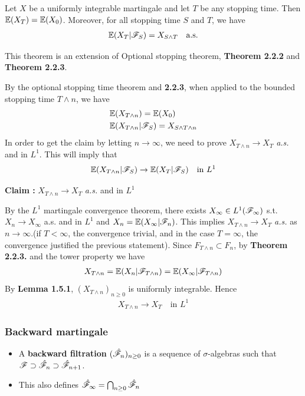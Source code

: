 \documentclass[10pt,a4paper]{report}
\newenvironment{proof}
{\begin{changemargin}{1cm}{0.5cm} 
	}%
	{\end{changemargin}
}
\newenvironment{subproof}
{\begin{changemargin}{0.5cm}{0.5cm} 
	}%
	{\end{changemargin}
}
\begin{document}
 Let $X$ be a uniformly integrable martingale and let $T$ be any stopping time. Then $\mathbb{E}(X_T) = \mathbb{E}(X_0)$. Moreover, for all stopping time $S$ and $T$, we have
\begin{align*}
\mathbb{E}(X_T |\mathscr{F}_S) = X_{S\wedge T} \quad \text{a.s.}
\end{align*}
\s

This theorem is an extension of Optional stopping theorem, \textbf{Theorem 2.2.2} and \textbf{Theorem 2.2.3}.
\begin{proof}
\pf By the optional stopping time theorem and \textbf{2.2.3}, when applied to the bounded stopping time $T\wedge n$, we have
\begin{align*}
& \mathbb{E}(X_{T\wedge n}) = \mathbb{E}(X_0) \\
& \mathbb{E}(X_{T\wedge n}|\mathscr{F}_S) = X_{S\wedge T\wedge n}
\end{align*}
In order to get the claim by letting $n\rightarrow \infty$, we need to prove $X_{T\wedge n} \rightarrow X_T$ \emph{a.s.} and in $L^1$. This will imply that
\begin{align*}
\mathbb{E}(X_{T\wedge n}|\mathscr{F}_S) \rightarrow \mathbb{E}(X_{T}|\mathscr{F}_S) \quad \text{in } L^1
\end{align*}
\begin{subproof}
\textbf{Claim :} $X_{T\wedge n} \rightarrow X_T$ \emph{a.s.} and in $L^1$

\pf By the $L^1$ martingale convergence theorem, there exists $X_{\infty} \in L^1(\mathscr{F}_{\infty})$ s.t. $X_n \rightarrow X_{\infty}$ a.s. and in $L^1$ and $X_n = \mathbb{E}(X_{\infty}|\mathscr{F}_n)$. This implies $X_{T\wedge n}\rightarrow X_T$ \emph{a.s.} as $n\rightarrow \infty$.(if $T<\infty$, the convergence trivial, and in the case $T=\infty$, the convergence justified the previous statement). Since $F_{T\wedge n} \subset F_n$, by \textbf{Theorem 2.2.3.} and the tower property we have
\begin{align*}
X_{T\wedge n} = \mathbb{E}(X_n | \mathscr{F}_{T\wedge n})= \mathbb{E}(X_{\infty}|\mathscr{F}_{T\wedge n})
\end{align*}
By \textbf{Lemma 1.5.1}, $(X_{T\wedge n})_{n\geq 0}$ is uniformly integrable. Hence
\begin{align*}
X_{T\wedge n} \rightarrow X_T \quad \text{in } L^1
\end{align*}
\end{subproof}

\eop
\end{proof}
\s

\subsubsection*{Backward martingale}
\begin{itemize}
\item A \textbf{backward filtration} $(\hat{\mathscr{F}}_n)_{n\geq 0}$ is a sequence of $\sigma$-algebras such that $\mathscr{F} \supset \hat{\mathscr{F}}_n \supset \hat{\mathscr{F}}_{n+1}$.
\item This also defines $\hat{\mathscr{F}}_{\infty} = \bigcap_{n\geq 0} \hat{\mathscr{F}}_n$
\end{itemize}
\s
\end{document}

